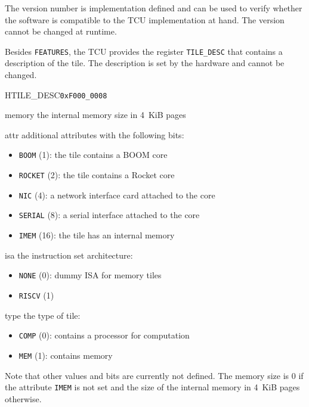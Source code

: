 The version number is implementation defined and can be used to verify whether the software is
compatible to the TCU implementation at hand. The version cannot be changed at runtime.

Besides \texttt{FEATURES}, the TCU provides the register \texttt{TILE\_DESC} that contains a
description of the tile. The description is set by the hardware and cannot be changed.

\begin{register}{H}{TILE\_DESC}{\texttt{0xF000\_0008}}
  \regnewline%
  \begin{regdesc}\begin{reglist}
    \item[memory] the internal memory size in 4~KiB pages
    \item[attr] additional attributes with the following bits:
    \begin{itemize}
      \item \texttt{BOOM} (1): the tile contains a BOOM core
      \item \texttt{ROCKET} (2): the tile contains a Rocket core
      \item \texttt{NIC} (4): a network interface card attached to the core
      \item \texttt{SERIAL} (8): a serial interface attached to the core
      \item \texttt{IMEM} (16): the tile has an internal memory
    \end{itemize}
    \item[isa] the instruction set architecture:
    \begin{itemize}
      \item \texttt{NONE} (0): dummy ISA for memory tiles
      \item \texttt{RISCV} (1)
    \end{itemize}
    \item[type] the type of tile:
    \begin{itemize}
      \item \texttt{COMP} (0): contains a processor for computation
      \item \texttt{MEM} (1): contains memory
    \end{itemize}
  \end{reglist}\end{regdesc}
\end{register}

\noindent Note that other values and bits are currently not defined. The memory size is 0 if the
attribute \texttt{IMEM} is not set and the size of the internal memory in 4~KiB pages otherwise.

